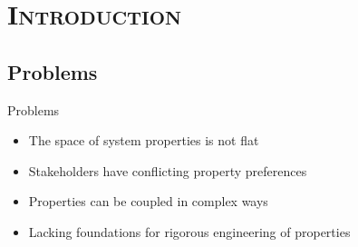 \documentclass[xcolor=x11names,compress]{beamer}
\renewcommand{\(}{\begin{columns}}
\renewcommand{\)}{\end{columns}}
\newcommand{\<}[1]{\begin{column}{#1}}
\renewcommand{\>}{\end{column}}
\begin{document}


\section{\scshape Introduction}
\subsection{Problems}
\begin{frame}{Problems}
\begin{itemize}
\item The space of system properties is not flat
\item Stakeholders have conflicting property preferences
\item Properties can be coupled in complex ways
\item Lacking foundations for rigorous engineering of properties
\end{itemize}
\end{frame}
\end{document}
